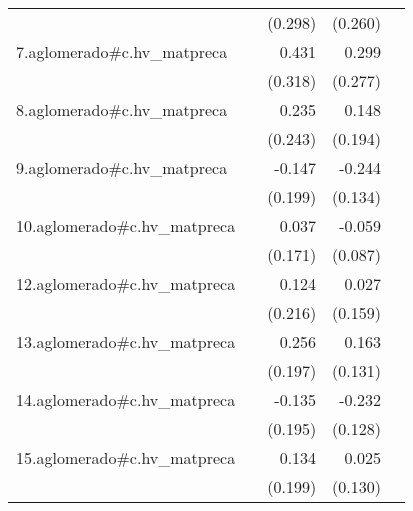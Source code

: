 {\begin{longtable}{l*{4}{D{.}{.}{-1}}}
            &                     &     (0.298)         &     (0.260)         &                     \\
\addlinespace
7.aglomerado#c.hv\_matpreca&                     &       0.431         &       0.299         &                     \\
            &                     &     (0.318)         &     (0.277)         &                     \\
\addlinespace
8.aglomerado#c.hv\_matpreca&                     &       0.235         &       0.148         &                     \\
            &                     &     (0.243)         &     (0.194)         &                     \\
\addlinespace
9.aglomerado#c.hv\_matpreca&                     &      -0.147         &      -0.244         &                     \\
            &                     &     (0.199)         &     (0.134)         &                     \\
\addlinespace
10.aglomerado#c.hv\_matpreca&                     &       0.037         &      -0.059         &                     \\
            &                     &     (0.171)         &     (0.087)         &                     \\
\addlinespace
12.aglomerado#c.hv\_matpreca&                     &       0.124         &       0.027         &                     \\
            &                     &     (0.216)         &     (0.159)         &                     \\
\addlinespace
13.aglomerado#c.hv\_matpreca&                     &       0.256         &       0.163         &                     \\
            &                     &     (0.197)         &     (0.131)         &                     \\
\addlinespace
14.aglomerado#c.hv\_matpreca&                     &      -0.135         &      -0.232         &                     \\
            &                     &     (0.195)         &     (0.128)         &                     \\
\addlinespace
15.aglomerado#c.hv\_matpreca&                     &       0.134         &       0.025         &                     \\
            &                     &     (0.199)         &     (0.130)         &                     \\

\end{longtable}}
